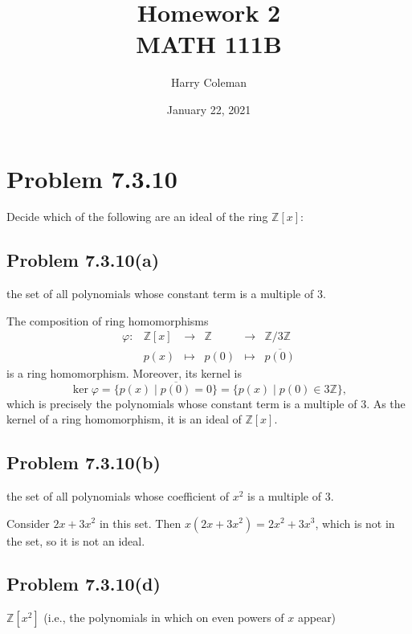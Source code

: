 \documentclass[12pt]{article}
\title{Homework 2\\
    \large MATH 111B
}
\author{Harry Coleman}
\date{January 22, 2021}
\newenvironment{problem}
    {\begin{lrbox}{\mybox}\begin{minipage}{0.98\textwidth}}
    {\end{minipage}\end{lrbox}\begin{center}\framebox[\textwidth]{\usebox{\mybox}}\end{center}}
\theoremstyle{definition}
\newcommand{\Z}{\mathbb{Z}}
\renewcommand{\phi}{\varphi}
\newcommand{\conj}{\overline}
\begin{document}
\maketitle

\section{Problem 7.3.10}
\begin{problem}
    Decide which of the following are an ideal of the ring $\Z[x]$:
\end{problem}

\subsection{Problem 7.3.10(a)}
\begin{problem}
    the set of all polynomials whose constant term is a multiple of $3$.
\end{problem}

The composition of ring homomorphisms
\[
    \begin{array}{cccccc}
        \phi : & \Z[x] & \to & \Z & \to & \Z/3\Z \\
             & p(x) & \mapsto & p(0) & \mapsto & \conj{p(0)}
    \end{array}
\]
is a ring homomorphism. Moreover, its kernel is
\[
    \ker\phi
        = \{p(x) \mid \conj{p(0)} = 0\}
        = \{p(x) \mid p(0) \in 3\Z\},
\]
which is precisely the polynomials whose constant term is a multiple of $3$. As the kernel of a ring homomorphism, it is an ideal of $\Z[x]$.



\subsection{Problem 7.3.10(b)}
\begin{problem}
    the set of all polynomials whose coefficient of $x^2$ is a multiple of $3$.
\end{problem}

Consider $2x + 3x^2$ in this set. Then $x(2x + 3x^2) = 2x^2 + 3x^3$, which is not in the set, so it is not an ideal.

\subsection{Problem 7.3.10(d)}
\begin{problem}
    $\Z[x^2]$ (i.e., the polynomials in which on even powers of $x$ appear)
\end{problem}
\end{document}
